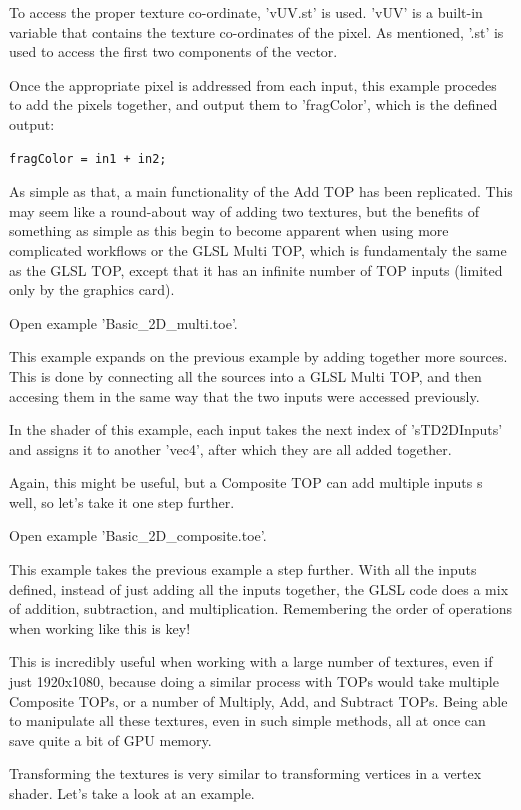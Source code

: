 \begin{fullwidth}
To access the proper texture co-ordinate, 'vUV.st' is used. 'vUV' is a built-in variable that contains the texture co-ordinates of the pixel. As mentioned, '.st' is used to access the first two components of the vector.

Once the appropriate pixel is addressed from each input, this example procedes to add the pixels together, and output them to 'fragColor', which is the defined output:

\begin{lstlisting}
fragColor = in1 + in2;
\end{lstlisting}

As simple as that, a main functionality of the Add TOP has been replicated. This may seem like a round-about way of adding two textures, but the benefits of something as simple as this begin to become apparent when using more complicated workflows or the GLSL Multi TOP, which is fundamentaly the same as the GLSL TOP, except that it has an infinite number of TOP inputs (limited only by the graphics card).

Open example 'Basic\_2D\_multi.toe'.

This example expands on the previous example by adding together more sources. This is done by connecting all the sources into a GLSL Multi TOP, and then accesing them in the same way that the two inputs were accessed previously.

In the shader of this example, each input takes the next index of 'sTD2DInputs' and assigns it to another 'vec4', after which they are all added together.

Again, this might be useful, but a Composite TOP can add multiple inputs s well, so let's take it one step further.

Open example 'Basic\_2D\_composite.toe'.

This example takes the previous example a step further. With all the inputs defined, instead of just adding all the inputs together, the GLSL code does a mix of addition, subtraction, and multiplication. Remembering the order of operations when working like this is key!

This is incredibly useful when working with a large number of textures, even if just 1920x1080, because doing a similar process with TOPs would take multiple Composite TOPs, or a number of Multiply, Add, and Subtract TOPs. Being able to manipulate all these textures, even in such simple methods, all at once can save quite a bit of GPU memory.

Transforming the textures is very similar to transforming vertices in a vertex shader. Let's take a look at an example.


\end{fullwidth}
